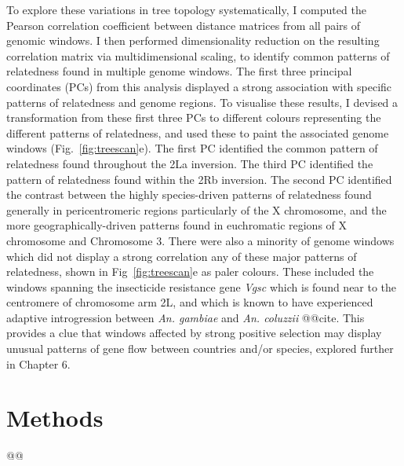 \documentclass[a4paper,11pt,abstracton,hidelinks]{scrartcl}
\begin{document}
To explore these variations in tree topology systematically, I computed the Pearson correlation coefficient between distance matrices from all pairs of genomic windows.
%
I then performed dimensionality reduction on the resulting correlation matrix via multidimensional scaling, to identify common patterns of relatedness found in multiple genome windows.
%
The first three principal coordinates (PCs) from this analysis displayed a strong association with specific patterns of relatedness and genome regions.
%
To visualise these results, I devised a transformation from these first three PCs to different colours representing the different patterns of relatedness, and used these to paint the associated genome windows (Fig.~\ref{fig:treescan}e).
%
The first PC identified the common pattern of relatedness found throughout the 2La inversion.
%
The third PC identified the pattern of relatedness found within the 2Rb inversion.
%
The second PC identified the contrast between the highly species-driven patterns of relatedness found generally in pericentromeric regions particularly of the X chromosome, and the more geographically-driven patterns found in euchromatic regions of X chromosome and Chromosome 3.
%
There were also a minority of genome windows which did not display a strong correlation any of these major patterns of relatedness, shown in Fig~\ref{fig:treescan}e as paler colours.
%
These included the windows spanning the insecticide resistance gene \textit{Vgsc} which is found near to the centromere of chromosome arm 2L, and which is known to have experienced adaptive introgression between \textit{An. gambiae} and \textit{An. coluzzii} @@cite.
%
This provides a clue that windows affected by strong positive selection may display unusual patterns of gene flow between countries and/or species, explored further in Chapter 6.


\section{Methods}\label{sec:methods}


@@


\end{document}
